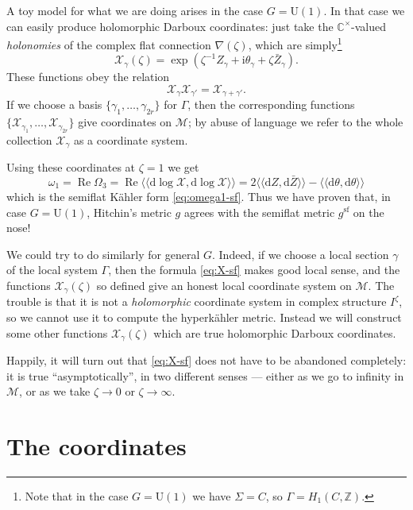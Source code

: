 \documentclass[12pt,letterpaper,reqno]{article}
\numberwithin{equation}{section}
\newcommand{\cM}{\ensuremath{\mathcal M}}
\newcommand{\cX}{\ensuremath{\mathcal X}}
\newcommand{\C}{\ensuremath{\mathbb C}}
\newcommand{\Z}{\ensuremath{\mathbb Z}}
\newcommand{\kahler}{K\"ahler\xspace}
\newcommand{\hk}{hyperk\"ahler\xspace}
\newcommand{\I}{{\mathrm i}}
\newcommand{\de}{\mathrm{d}}
\renewcommand{\sf}{\mathrm{sf}}
\newcommand{\DIP}[1]{\langle\!\langle#1\rangle\!\rangle}
\newcommand{\ti}[1]{\textit{#1}}
\DeclareMathOperator{\re}{Re}
\newcommand{\U}{\mathrm{U}}
\begin{document}
\begin{remark}[The case of $G = \U(1)$]
A toy model for what we are doing arises in the
case $G = \U(1)$. In that case we can easily produce holomorphic Darboux coordinates: 
just take the $\C^\times$-valued \ti{holonomies} of the 
complex flat connection $\nabla(\zeta)$, which are simply\footnote{Note that in the case
$G = \U(1)$ we have $\Sigma = C$, so $\Gamma = H_1(C,\Z)$.}
\begin{equation} \label{eq:X-sf}
  \cX_\gamma(\zeta) = \exp \left( \zeta^{-1} Z_\gamma + \I \theta_\gamma + \zeta \bar Z_\gamma \right).
\end{equation}
These functions obey the relation
\begin{equation}
	\cX_{\gamma} \cX_{\gamma'} = \cX_{\gamma + \gamma'}.
\end{equation}
If we choose a basis $\{\gamma_1, \dots, \gamma_{2r}\}$
for $\Gamma$, then the corresponding functions
$\{\cX_{\gamma_1}, \dots, \cX_{\gamma_{2r}}\}$
give coordinates on $\cM$; by abuse of
language we refer to the whole collection 
$\cX_\gamma$ as a coordinate system.

Using these coordinates at $\zeta = 1$ we get
\begin{equation}
 \omega_1 = \re \Omega_3 = \re \DIP{\de \log \cX, \de \log \cX} = 2 \DIP{\de Z, \de \bar{Z}} - \DIP{\de \theta, \de \theta}
\end{equation}
which is the semiflat \kahler form \eqref{eq:omega1-sf}.
Thus we have proven that, in case $G = \U(1)$, Hitchin's metric $g$ agrees
with the semiflat metric $g^\sf$ on the nose!
\end{remark}

We could try to do similarly for general $G$.
Indeed, if we choose a local section $\gamma$ of the local
system $\Gamma$, then 
the formula \eqref{eq:X-sf} makes good local sense,
and the functions $\cX_\gamma(\zeta)$ so defined 
give an honest local coordinate system
on $\cM$. The trouble is that it is not a \ti{holomorphic}
coordinate system in complex structure $I^\zeta$, so we 
cannot use it to compute the \hk metric.
Instead we will construct some
other functions $\cX_\gamma(\zeta)$ which are true 
holomorphic Darboux coordinates. 

Happily, it will turn out 
that \eqref{eq:X-sf} does not have to be abandoned completely:
it is true ``asymptotically'', in two different senses --- 
either as we go
to infinity in $\cM$, or as we take $\zeta \to 0$ or
$\zeta \to \infty$.


\section{The coordinates}
\end{document}
